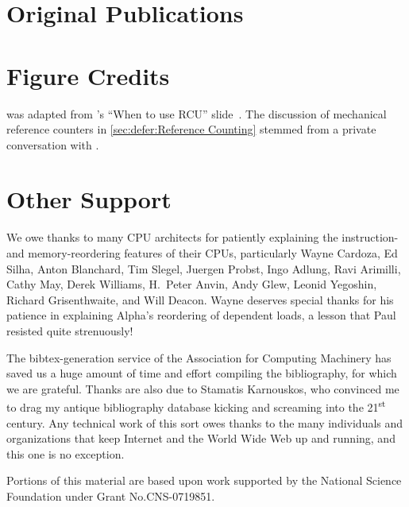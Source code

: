 \section{Original Publications}

\ListOriginalPublications

\section{Figure Credits}

\ListContributions

 was adapted from
's ``When to use RCU'' slide~\cite{FedorPikus2017RCUthenWhat}.
The discussion of mechanical reference counters in
\cref{sec:defer:Reference Counting}
stemmed from a private conversation with .

\section{Other Support}

We owe thanks to many CPU architects for patiently explaining the
instruction- and memory-reordering features of their CPUs, particularly
Wayne Cardoza, Ed Silha, Anton Blanchard, Tim Slegel, Juergen Probst,
Ingo Adlung, Ravi Arimilli, Cathy May, Derek Williams,
H.~Peter Anvin,
Andy Glew, Leonid Yegoshin,
Richard Grisenthwaite, and Will Deacon.
Wayne deserves special thanks for his patience in explaining Alpha's reordering
of dependent loads, a lesson that Paul resisted quite strenuously!

The bibtex-generation service of the Association for Computing Machinery
has saved us a huge amount of time and effort compiling the bibliography,
for which we are grateful.
Thanks are also due to Stamatis Karnouskos, who convinced me to drag my
antique bibliography database kicking and screaming into the
21\textsuperscript{st} century.
Any technical work of this sort owes thanks to the many individuals and
organizations that keep Internet and the World Wide Web up and running,
and this one is no exception.

Portions of this material are based upon work supported by the National
Science Foundation under Grant No.\@ CNS-0719851.

